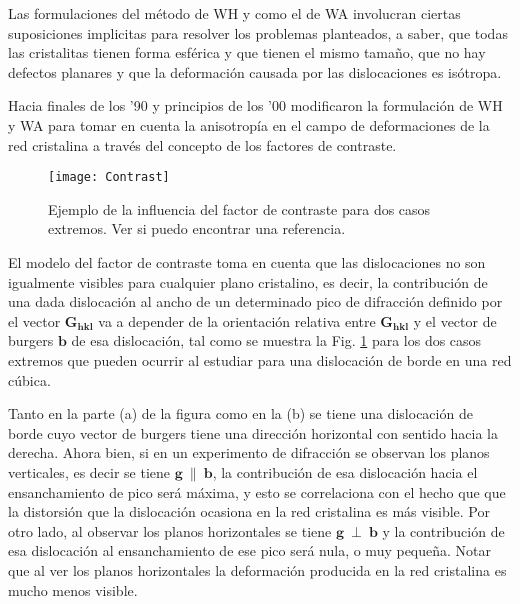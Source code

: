 Las formulaciones del método de WH y como el de WA involucran ciertas suposiciones implicitas para resolver los problemas planteados, a saber, que todas las cristalitas tienen forma esférica y que tienen el mismo tamaño, que no hay defectos planares y que la deformación causada por las dislocaciones es isótropa. 

Hacia finales de los '90 y principios de los '00 modificaron la formulación de WH y WA para tomar en cuenta la anisotropía en el campo de deformaciones de la red cristalina a través del concepto de los factores de contraste.

\begin{figure}[!htb]
  \centering
  \texttt{[image: Contrast]}
  \caption{Ejemplo de la influencia del factor de contraste para dos casos extremos. Ver si puedo encontrar una referencia.}
  \label{fig:contrast}
\end{figure}

El modelo del factor de contraste toma en cuenta que las dislocaciones no son igualmente visibles para cualquier plano cristalino, es decir, la contribución de una dada dislocación al ancho de un determinado pico de difracción definido por el vector $\mathbf{G_{hkl}}$ va a depender de la orientación relativa entre $\mathbf{G_{hkl}}$ y el vector de burgers $\mathbf{b}$ de esa dislocación, tal como se muestra la Fig. \ref{fig:contrast} para los dos casos extremos que pueden ocurrir al estudiar para una dislocación de borde en una red cúbica.

Tanto en la parte (a) de la figura como en la (b) se tiene una dislocación de borde cuyo vector de burgers tiene una dirección horizontal con sentido hacia la derecha. 
Ahora bien, si en un experimento de difracción se observan los planos verticales, es decir se tiene $\mathbf{g} \ \parallel \ \mathbf{b}$, la contribución de esa dislocación hacia el ensanchamiento de pico será máxima, y esto se correlaciona con el hecho que que la distorsión que la dislocación ocasiona en la red cristalina es más visible.
Por otro lado, al observar los planos horizontales se tiene $\mathbf{g} \ \perp \ \mathbf{b}$ y la contribución de esa dislocación al ensanchamiento de ese pico será nula, o muy pequeña.
Notar que al ver los planos horizontales la deformación producida en la red cristalina es mucho menos visible.

